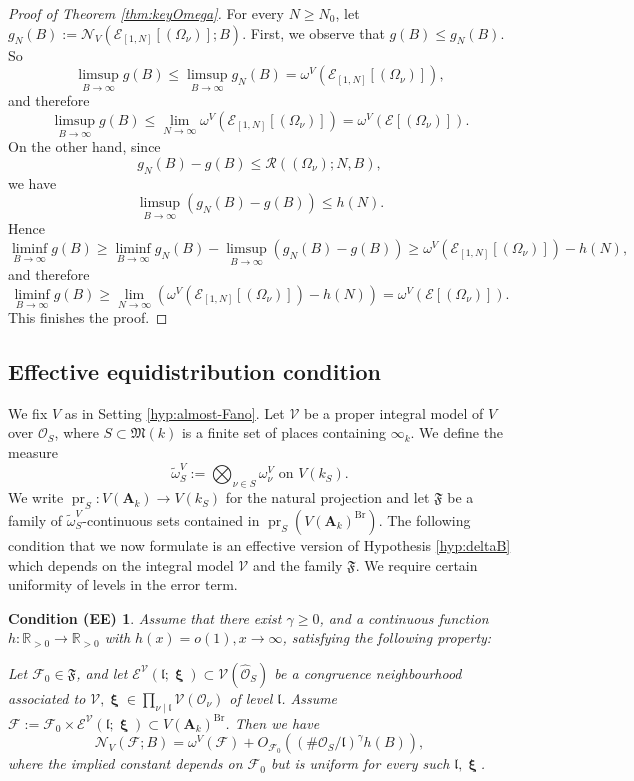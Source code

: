 \documentclass[11pt,letterpaper]{amsart}
\newcommand{\BR}{{\mathbb {R}}}
\newcommand{\CE}{{\mathcal {E}}}
\newcommand{\CF}{{\mathcal {F}}}
\newcommand{\CN}{{\mathcal {N}}}
\newcommand{\CO}{{\mathcal {O}}}
\newcommand{\CR}{{\mathcal {R}}}
\newcommand{\CV}{{\mathcal {V}}}
\newcommand{\RA}{{\mathbf {A}}}
\DeclareMathOperator{\bxi}{\mathbf{\xi}}
\theoremstyle{plain}
\numberwithin{equation}{section}
\newtheorem*{condEE}{Condition (EE)}
\theoremstyle{definition}
\theoremstyle{remark}
\begin{document}
\begin{proof}[Proof of Theorem \ref{thm:keyOmega}]
For every $N\geqslant N_0$, let $g_N(B):=\CN_V\left(\CE_{[1,N]}[(\Omega_{\nu})];B\right)$.
First, we observe that $g(B)\leqslant g_N(B)$. So
$$\limsup_{B\to\infty} g(B)\leqslant\limsup_{B\to\infty}g_N(B)=\omega^V\left(\CE_{[1,N]}[(\Omega_{\nu})]\right),$$ and therefore $$\limsup_{B\to\infty}g(B)\leqslant \lim_{N\to\infty}\omega^V\left(\CE_{[1,N]}[(\Omega_{\nu})]\right)=\omega^V\left(\CE[(\Omega_{\nu})]\right).$$
On the other hand, since $$g_N(B)-g(B)\leqslant \CR((\Omega_\nu);N,B),$$ we have $$\limsup_{B\to\infty}\left(g_N(B)-g(B)\right)\leqslant h(N).$$ Hence
$$\liminf_{B\to\infty} g(B)\geqslant \liminf_{B\to\infty} g_N(B)-\limsup_{B\to\infty}\left(g_N(B)-g(B)\right)\geqslant \omega^V\left(\CE_{[1,N]}[(\Omega_{\nu})]\right)-h(N),$$ and therefore
$$\liminf_{B\to\infty} g(B)\geqslant \lim_{N\to\infty} \left(\omega^V\left(\CE_{[1,N]}[(\Omega_{\nu})]\right)-h(N)\right)=\omega^V\left(\CE[(\Omega_{\nu})]\right).$$
This finishes the proof.
\end{proof}

\subsection{Effective equidistribution condition}\label{se:condEE}
We fix $V$ as in Setting \ref{hyp:almost-Fano}. Let $\CV$ be a proper integral model of $V$  over $\CO_S$, where $S\subset \mathfrak{M}(k)$ is a finite set of places containing $\infty_k$. We define the measure \begin{equation}\label{eq:omegaSV}
	\widetilde{\omega}_S^V:=\bigotimes_{\nu\in S}\omega_\nu^V\text{ on }V(k_S).
\end{equation} We write $\operatorname{pr}_S:V(\RA_k)\to V(k_S)$ for the natural projection and let $\mathfrak{F}$ be a family of $\widetilde{\omega}_S^V$-continuous sets contained in $\operatorname{pr}_S(V(\RA_k)^{\operatorname{Br}})$. 
The following condition that we now formulate is an effective version of Hypothesis \ref{hyp:deltaB} which depends on the integral model $\CV$ and the family $\mathfrak{F}$. We require certain uniformity of levels in the error term.
\begin{condEE}
 Assume that there exist $\gamma\geqslant 0$,  and a continuous function $h:\BR_{>0}\to\BR_{>0}$ with $h(x)=o(1),x\to\infty$, satisfying the following property:
		
		Let $\CF_0\in\mathfrak{F}$, and let $\CE^\CV(\mathfrak{l};\bxi)\subset \CV(\widehat{\CO}_S)$ be a congruence neighbourhood  associated to $\CV,\bxi\in\prod_{\nu\mid \mathfrak{l}} \CV(\CO_\nu)$ of level $\mathfrak{l}$. Assume  $\CF:=\CF_0\times \CE^\CV(\mathfrak{l};\bxi)\subset V(\RA_k)^{\operatorname{Br}}$. Then we have
		$$\CN_V(\CF;B)=\omega^V(\CF)+O_{\CF_0}\left((\#\CO_S/\mathfrak{l})^\gamma h(B)\right),$$  where the implied constant depends on $\CF_0$ but is uniform for every such $\mathfrak{l},\bxi$.
\end{condEE}
\end{document}

